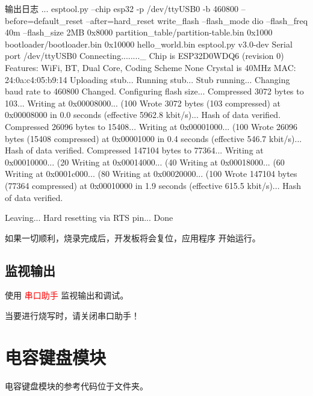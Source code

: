 \documentclass[lang=cn,newtx,10pt,scheme=chinese]{elegantbook}
\begin{document}
\begin{mycode}{输出日志}
...
esptool.py --chip esp32 -p /dev/ttyUSB0 -b 460800 --before=default_reset --after=hard_reset write_flash --flash_mode dio --flash_freq 40m --flash_size 2MB 0x8000 partition_table/partition-table.bin 0x1000 bootloader/bootloader.bin 0x10000 hello_world.bin
esptool.py v3.0-dev
Serial port /dev/ttyUSB0
Connecting........_
Chip is ESP32D0WDQ6 (revision 0)
Features: WiFi, BT, Dual Core, Coding Scheme None
Crystal is 40MHz
MAC: 24:0a:c4:05:b9:14
Uploading stub...
Running stub...
Stub running...
Changing baud rate to 460800
Changed.
Configuring flash size...
Compressed 3072 bytes to 103...
Writing at 0x00008000... (100 %
Wrote 3072 bytes (103 compressed) at 0x00008000 in 0.0 seconds (effective 5962.8 kbit/s)...
Hash of data verified.
Compressed 26096 bytes to 15408...
Writing at 0x00001000... (100 %
Wrote 26096 bytes (15408 compressed) at 0x00001000 in 0.4 seconds (effective 546.7 kbit/s)...
Hash of data verified.
Compressed 147104 bytes to 77364...
Writing at 0x00010000... (20 %
Writing at 0x00014000... (40 %
Writing at 0x00018000... (60 %
Writing at 0x0001c000... (80 %
Writing at 0x00020000... (100 %
Wrote 147104 bytes (77364 compressed) at 0x00010000 in 1.9 seconds (effective 615.5 kbit/s)...
Hash of data verified.

Leaving...
Hard resetting via RTS pin...
Done
\end{mycode}

如果一切顺利，烧录完成后，开发板将会复位，应用程序  开始运行。

\section{监视输出}

使用 \textcolor{red}{串口助手} 监视输出和调试。

\begin{marker}
当要进行烧写时，请关闭串口助手！
\end{marker}

\chapter{电容键盘模块}

\begin{marker}
电容键盘模块的参考代码位于文件夹。
\end{marker}
\end{document}
